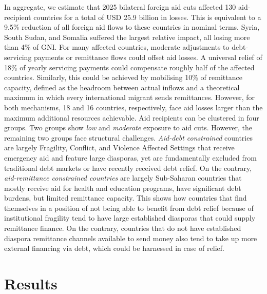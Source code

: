 \documentclass[fleqn,10pt,twocolumn]{wlscirep}
\begin{document}
{
In aggregate, we estimate that 2025 bilateral foreign aid cuts affected 130 aid-recipient countries for a total of USD 25.9 billion in losses. This is equivalent to a 9.5\% reduction of all foreign aid flows to these countries in nominal terms. Syria, South Sudan, and Somalia suffered the largest relative impact, all losing more than 4\% of GNI. For many affected countries, moderate adjustments to debt-servicing payments or remittance flows could offset aid losses. A universal relief of 18\% of yearly servicing payments could compensate roughly half of the affected countries. Similarly, this could be achieved by mobilising 10\% of remittance capacity, defined as the headroom between actual inflows and a theoretical maximum in which every international migrant sends remittances. However, for both mechanisms, 18 and 16 countries, respectively, face aid losses larger than the maximum additional resources achievable. Aid recipients can be clustered in four groups. Two groups show \textit{low} and \textit{moderate} exposure to aid cuts. However, the remaining two groups face structural challenges. \textit{Aid-debt constrained} countries are largely Fragility, Conflict, and Violence Affected Settings \cite{worldbank2025fcs} that receive emergency aid and feature large diasporas, yet are fundamentally excluded from traditional debt markets or have recently received debt relief. On the contrary, \textit{aid-remittance constrained countries} are largely Sub-Saharan countries that mostly receive aid for health and education programs, have significant debt burdens, but limited remittance capacity. This shows how countries that find themselves in a position of not being able to benefit from debt relief because of institutional fragility tend to have large established diasporas that could supply remittance finance. On the contrary, countries that do not have established diaspora remittance channels available to send money also tend to take up more external financing via debt, which could be harnessed in case of relief.  
}

\section*{Results}
\end{document}
